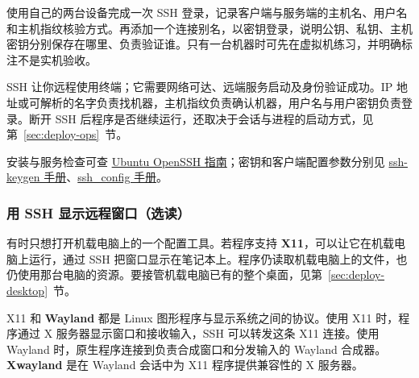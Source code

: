 \begin{exercise}\label{ex:deploy-ssh}
使用自己的两台设备完成一次 SSH 登录，记录客户端与服务端的主机名、用户名和主机指纹核验方式。再添加一个连接别名，以密钥登录，说明公钥、私钥、主机密钥分别保存在哪里、负责验证谁。只有一台机器时可先在虚拟机练习，并明确标注不是实机验收。
\end{exercise}

\begin{conclusion}
SSH 让你远程使用终端；它需要网络可达、远端服务启动及身份验证成功。IP 地址或可解析的名字负责找机器，主机指纹负责确认机器，用户名与用户密钥负责登录。断开 SSH 后程序是否继续运行，还取决于会话与进程的启动方式，见第~\ref{sec:deploy-ops}~节。
\end{conclusion}

安装与服务检查可查 \href{https://ubuntu.com/server/docs/how-to/security/openssh-server/}{Ubuntu OpenSSH 指南}；密钥和客户端配置参数分别见 \href{https://man.openbsd.org/ssh-keygen}{ssh-keygen 手册}、\href{https://man.openbsd.org/ssh_config}{ssh\_config 手册}。

\subsubsection{用 SSH 显示远程窗口（选读）}
\label{sec:deploy-x11-forwarding}

有时只想打开机载电脑上的一个配置工具。若程序支持 \textbf{X11}，可以让它在机载电脑上运行，通过 SSH 把窗口显示在笔记本上。程序仍读取机载电脑上的文件，也仍使用那台电脑的资源。要接管机载电脑已有的整个桌面，见第~\ref{sec:deploy-desktop}~节。

X11 和 \textbf{Wayland} 都是 Linux 图形程序与显示系统之间的协议。使用 X11 时，程序通过 X 服务器显示窗口和接收输入，SSH 可以转发这条 X11 连接。使用 Wayland 时，原生程序连接到负责合成窗口和分发输入的 Wayland 合成器。\textbf{Xwayland} 是在 Wayland 会话中为 X11 程序提供兼容性的 X 服务器。

